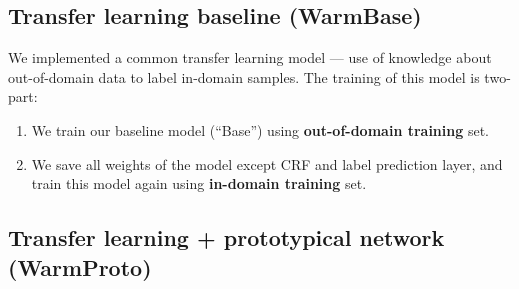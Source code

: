 
\subsection{Transfer learning baseline (WarmBase)}

We implemented a common transfer learning model --- use of knowledge about out-of-domain data to label in-domain samples. The training of this model is two-part:

\begin{enumerate}
	\item We train our baseline model (``Base'') using \textbf{out-of-domain training} set.
    \item We save all weights of the model except CRF and label prediction layer, and train this model again using \textbf{in-domain training} set.
\end{enumerate}



\subsection{Transfer learning + prototypical network (WarmProto)}

